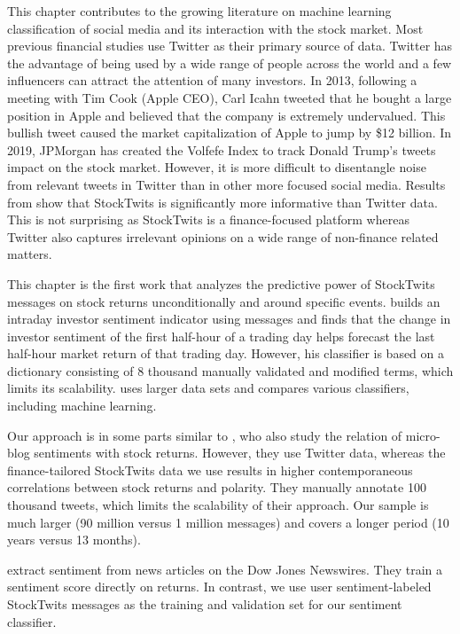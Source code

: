 This chapter contributes to the growing literature on machine learning classification of social media and its interaction with the stock market. Most previous financial studies use Twitter as their primary source of data. Twitter has the advantage of being used by a wide range of people across the world and a few influencers can attract the attention of many investors. In 2013, following a meeting with Tim Cook (Apple CEO), Carl Icahn tweeted that he bought a large position in Apple and believed that the company is extremely undervalued. This bullish tweet caused the market capitalization of Apple to jump by \$12 billion. In 2019, JPMorgan has created the Volfefe Index to track Donald Trump's tweets impact on the stock market. However, it is more difficult to disentangle noise from relevant tweets in Twitter than in other more focused social media. Results from \citet{Ghoshal} show that StockTwits is significantly more informative than Twitter data. This is not surprising as StockTwits is a finance-focused platform whereas Twitter also captures irrelevant opinions on a wide range of non-finance related matters. 

This chapter is the first work that analyzes the predictive power of StockTwits messages on stock returns unconditionally and around specific events. \citet{renault2017intraday} builds an intraday investor sentiment indicator using messages and finds that the change in investor sentiment of the first half-hour of a trading day helps forecast the last half-hour market return of that trading day. However, his classifier is based on a dictionary consisting of 8 thousand manually validated and modified terms, which limits its scalability. \citet{renault2020sentiment} uses larger data sets and compares various classifiers, including machine learning. 

Our approach is in some parts similar to \citet{ranco2015effects}, who also study the relation of micro-blog sentiments with stock returns. However, they use Twitter data, whereas the finance-tailored StockTwits data we use results in higher contemporaneous correlations between stock returns and polarity. They manually annotate 100 thousand tweets, which limits the scalability of their approach. Our sample is much larger (90 million versus 1 million messages) and covers a longer period (10 years versus 13 months). 

\citet{ke_kel_xiu_20} extract sentiment from news articles on the Dow Jones Newswires. They train a  sentiment score directly on returns. In contrast, we use user sentiment-labeled StockTwits messages as the training and validation set for our sentiment classifier.


